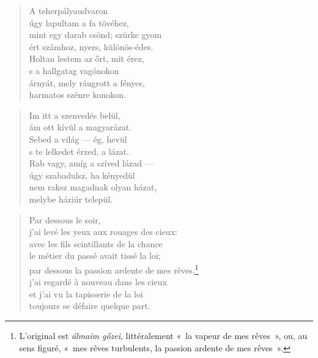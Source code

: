 \newpage

\vspace*{-15mm}
\centeredornament



\begin{verse}
  A teherpályaudvaron \\
  úgy lapultam a fa tövéhez, \\
  mint egy darab csönd; szürke gyom \\
  ért számhoz, nyers, különös-édes. \\
  Holtan lestem az őrt, mit érez, \\
  s a hallgatag vagónokon \\
  árnyát, mely ráugrott a fényes, \\
  harmatos szénre konokon.
\end{verse}

\bigskip


\begin{verse}
  Im itt a szenvedés belül, \\
  ám ott kívül a magyarázat. \\
  Sebed a világ --- ég, hevül \\
  s te lelkedet érzed, a lázat. \\
  Rab vagy, amíg a szíved lázad --- \\
  úgy szabadulsz, ha kényedül \\
  nem raksz magadnak olyan házat, \\
  melybe háziúr települ.
\end{verse}

\newpage

\vspace*{-15mm}
\centeredornament




\begin{verse}
  Par dessous le soir, \\
  j'ai levé les yeux aux rouages des cieux: \\
  avec les fils scintillants de la chance \\
  le métier du passé avait tissé la loi; \\
  par dessous la passion ardente de mes rêves,\footnote{L'original est
  \emph{álmaim gőzei}, littéralement «~la vapeur de mes rêves~», ou,
  au sens figuré, «~mes rêves turbulents, la passion ardente de mes
  rêves~».} \\
  j'ai regardé à nouveau dans les cieux \\
  et j'ai vu la tapisserie de la loi \\
  toujours se défaire quelque part.
\end{verse}

